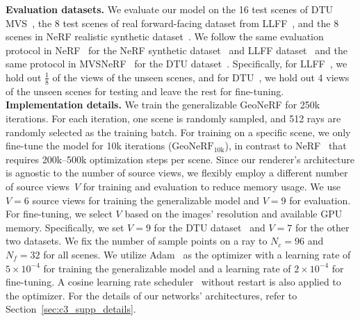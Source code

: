 \noindent\textbf{Evaluation datasets.} We evaluate our model on the 16 test scenes of DTU MVS~\citep{jensen2014large}, the 8 test scenes of real forward-facing dataset from LLFF~\citep{mildenhall2019llff}, and the 8 scenes in NeRF realistic synthetic dataset~\citep{mildenhall2020nerf}. We follow the same evaluation protocol in NeRF~\citep{mildenhall2020nerf} for the NeRF synthetic dataset~\citep{mildenhall2020nerf} and LLFF dataset~\citep{mildenhall2019llff} and the same protocol in MVSNeRF~\citep{chen2021mvsnerf} for the DTU dataset~\citep{jensen2014large}. Specifically, for LLFF~\citep{mildenhall2019llff}, we hold out $\frac{1}{8}$ of the views of the unseen scenes, and for DTU~\citep{jensen2014large}, we hold out 4 views of the unseen scenes for testing and leave the rest for fine-tuning.\\

\noindent\textbf{Implementation details.} We train the generalizable GeoNeRF for 250k iterations. For each iteration, one scene is randomly sampled, and 512 rays are randomly selected as the training batch. For training on a specific scene, we only fine-tune the model for 10k iterations ($\text{GeoNeRF}_{\text{10k}}$), in contrast to NeRF~\citep{mildenhall2020nerf} that requires 200k$\textrm{--}$500k optimization steps per scene. Since our renderer's architecture is agnostic to the number of source views, we flexibly employ a different number of source views~$V$ for training and evaluation to reduce memory usage. We use $V=6$ source views for training the generalizable model and $V=9$ for evaluation. For fine-tuning, we select $V$ based on the images' resolution and available GPU memory. Specifically, we set $V=9$ for the DTU dataset~\cite{jensen2014large} and $V=7$ for the other two datasets. We fix the number of sample points on a ray to $N_{c} = 96$ and $N_{f} = 32$ for all scenes. We utilize Adam~\citep{adam} as the optimizer with a learning rate of $5 \times 10^{-4}$ for training the generalizable model and a learning rate of $2 \times 10^{-4}$ for fine-tuning. A cosine learning rate scheduler~\citep{sgdr} without restart is also applied to the optimizer. For the details of our networks' architectures, refer to Section~\ref{sec:c3_supp_details}.

